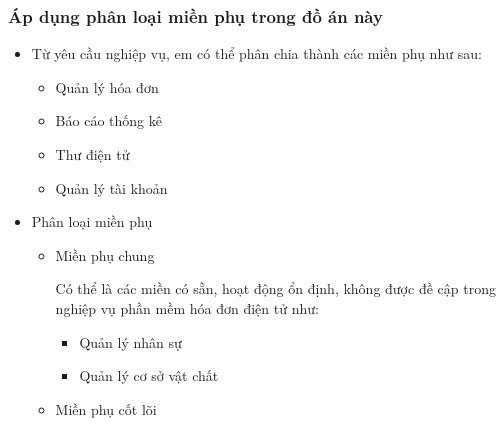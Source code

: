 \subsubsection{Áp dụng phân loại miền phụ trong đồ án này}

\begin{itemize}

\item Từ yêu cầu nghiệp vụ, em có thể phân chia thành các miền phụ như sau:

\begin{itemize}

\item Quản lý hóa đơn

\item Báo cáo thống kê







\item Thư điện tử

\item Quản lý tài khoản

\end{itemize}

\item Phân loại miền phụ

\begin{itemize}

\item Miền phụ chung

Có thể là các miền có sẵn, hoạt động ổn định, không được đề cập trong nghiệp vụ phần mềm hóa đơn điện tử như:

\begin{itemize}

\item Quản lý nhân sự

\item Quản lý cơ sở vật chất

\end{itemize}

\item Miền phụ cốt lõi


\end{itemize}
\end{itemize}

